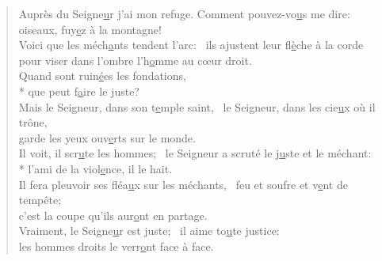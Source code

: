 
\begin{verse}
Auprès du Seigne\underline{u}r j’ai mon refuge.\psalmdagger
Comment pouvez-vo\underline{u}s me dire: \\
oiseaux, fuy\underline{e}z à la montagne! \\

Voici que les méch\underline{a}nts tendent l’arc:~\psalmdagger
ils ajustent leur fl\underline{è}che à la corde \\
pour viser dans l’ombre l’h\underline{o}mme au cœur droit. \\

Quand sont ruin\underline{é}es les fondations, \\*
que peut f\underline{a}ire le juste? \\

Mais le Seigneur, dans son t\underline{e}mple saint,~\psalmdagger
le Seigneur, dans les cie\underline{u}x où il trône, \\
garde les yeux ouv\underline{e}rts sur le monde. \\

Il voit, il scr\underline{u}te les hommes;~\psalmdagger
{}le Seigneur a scruté le j\underline{u}ste et le méchant: \\*
l’ami de la viol\underline{e}nce, il le hait. \\

Il fera pleuvoir ses fléa\underline{u}x sur les méchants,~\psalmdagger
feu et soufre et v\underline{e}nt de tempête; \\
c’est la coupe qu’ils aur\underline{o}nt en partage. \\

Vraiment, le Seigne\underline{u}r est juste;~\psalmdagger
il aime to\underline{u}te justice: \\
les hommes droits le verr\underline{o}nt face à face. \\
\end{verse}

